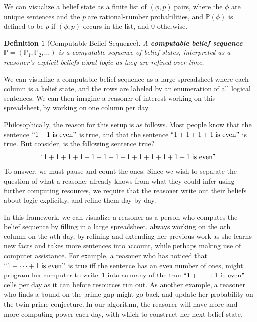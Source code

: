\documentclass[authordate,onecolumn,noenvironments]{miri-tech-article}
\newtheorem{definition}[theorem]{Definition}
\numberwithin{equation}{subsection}
\newcommand{\quot}[1]{``#1"}
\newcommand{\seq}[1]{{\overline{#1}}}
\newcommand{\prob}{p}
\newcommand{\nn}{n}
\newcommand{\BelState}{\mathbb{P}}
\newcommand{\BelSeq}{\seq{\BelState}}
\begin{document}
\noindent We can visualize  a belief state as a finite list of $(\phi, \prob)$ pairs, where the $\phi$ are unique sentences and the $\prob$ are rational-number probabilities, and $\BelState(\phi)$ is defined to be $\prob$ if $(\phi, \prob)$ occurs in the list, and $0$ otherwise.

\begin{definition}[Computable Belief Sequence]\label{def:belseq}
  A \textbf{computable belief sequence} $\BelSeq = (\BelState_1,\BelState_2,\ldots)$ is a computable sequence of belief states, interpreted as a reasoner's explicit beliefs about logic as they are refined over time.
\end{definition}
\noindent We can visualize a computable belief sequence as a large spreadsheet where each column is a belief state, and the rows are labeled by an enumeration of all logical sentences. We can then imagine a reasoner of interest working on this spreadsheet, by working on one column per day.

Philosophically, the reason for this setup is as follows. Most people know that the sentence $\quot{1+1\text{\ is even}}$ is true, and that the sentence $\quot{1+1+1+1\text{\ is even}}$ is true. But consider, is the following sentence true?
\[
  \quot{1+1+1+1+1+1+1+1+1+1+1+1+1\text{\ is even}}
\]
To answer, we must pause and count the ones. Since we wish to separate the question of what a reasoner already knows from what they could infer using further computing resources, we require that the reasoner write out their beliefs about logic explicitly, and refine them day by day.

In this framework, we can visualize a reasoner as a person who computes the belief sequence by filling in a large spreadsheet, always working on the $\nn$th column on the $\nn$th day, by refining and extending her previous work as she learns new facts and takes more sentences into account, while perhaps making use of computer assistance. For example, a reasoner who has noticed that $\quot{1 + \cdots + 1\text{\ is even}}$ is true iff the sentence has an even number of ones, might program her computer to write~1 into as many of the true $\quot{1+\cdots+1\text{\ is even}}$ cells per day as it can before resources run out. As another example, a reasoner who finds a bound on the prime gap might go back and update her probability on the twin prime conjecture. In our algorithm, the reasoner will have more and more computing power each day, with which to construct her next belief state.
\end{document}
